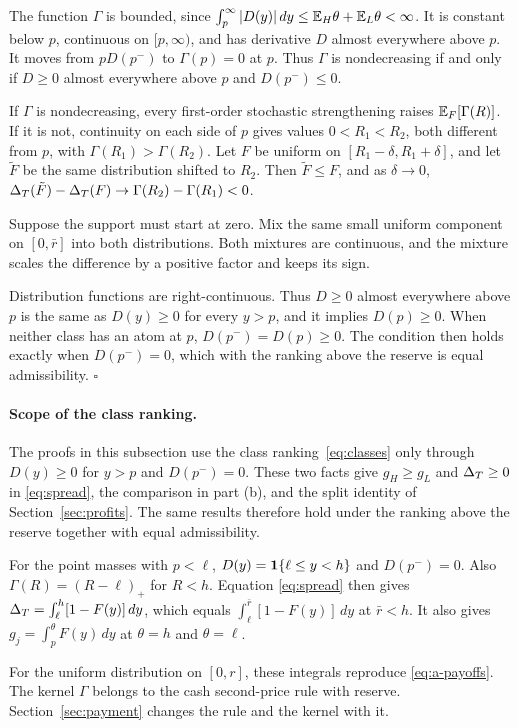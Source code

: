 The function \(\Gamma\) is bounded, since \(\int_p^\infty|D(y)|\,dy\le\mathbb{E}_H\theta+\mathbb{E}_L\theta<\infty\). It is
constant below \(p\), continuous on \([p,\infty)\), and has derivative \(D\) almost everywhere above \(p\). It
moves from \(pD(p^-)\) to \(\Gamma(p)=0\) at \(p\). Thus \(\Gamma\) is nondecreasing if and only if \(D\ge0\) almost
everywhere above \(p\) and \(D(p^-)\le0\).

If \(\Gamma\) is nondecreasing, every first-order stochastic strengthening raises \(\mathbb{E}_F[\Gamma(R)]\). If it is not,
continuity on each side of \(p\) gives values \(0<R_1<R_2\), both different from \(p\), with
\(\Gamma(R_1)>\Gamma(R_2)\). Let \(F\) be uniform on \([R_1-\delta,R_1+\delta]\), and let \(\tilde F\) be the same distribution
shifted to \(R_2\). Then \(\tilde F\le F\), and as \(\delta\to0\),
\(\Delta_T(\tilde F)-\Delta_T(F)\to\Gamma(R_2)-\Gamma(R_1)<0\).

Suppose the support must start at zero. Mix the same small uniform component on \([0,\bar r]\) into both distributions.
Both mixtures are continuous, and the mixture scales the difference by a positive factor and keeps its sign.

Distribution functions are right-continuous. Thus \(D\ge0\) almost everywhere above \(p\) is the same as
\(D(y)\ge0\) for every \(y>p\), and it implies \(D(p)\ge0\). When neither class has an atom at \(p\),
\(D(p^-)=D(p)\ge0\). The condition then holds exactly when \(D(p^-)=0\), which with the ranking above the
reserve is equal admissibility. \(\square\)

\paragraph{Scope of the class ranking.}
The proofs in this subsection use the class ranking~\eqref{eq:classes} only through \(D(y)\ge0\) for \(y>p\) and
\(D(p^-)=0\). These two facts give \(g_H\ge g_L\) and \(\Delta_T\ge0\) in \eqref{eq:spread}, the comparison in part
(b), and the split identity of Section~\ref{sec:profits}. The same results therefore hold under the ranking
above the reserve together with equal admissibility.

For the point masses with \(p<\ell\), \(D(y)=\mathbf{1}\{\ell\le y<h\}\) and \(D(p^-)=0\). Also \(\Gamma(R)=(R-\ell)_+\)
for \(R<h\). Equation \eqref{eq:spread} then gives \(\Delta_T=\int_\ell^h[1-F(y)]\,dy\), which equals
\(\int_\ell^{\bar r}[1-F(y)]\,dy\) at \(\bar r<h\). It also gives \(g_j=\int_p^\theta F(y)\,dy\) at \(\theta=h\)
and \(\theta=\ell\).

For the uniform distribution on \([0,r]\), these integrals reproduce \eqref{eq:a-payoffs}. The kernel \(\Gamma\) belongs to
the cash second-price rule with reserve. Section~\ref{sec:payment} changes the rule and the kernel with it.
